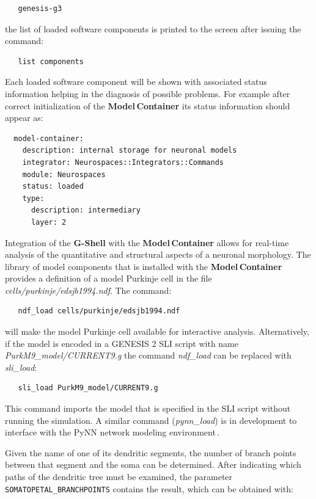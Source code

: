\documentclass[12pt]{article}
\begin{document}
{\footnotesize
\begin{verbatim}
   genesis-g3
\end{verbatim}
}

the list of loaded software components is printed to the screen after
issuing the command:

{\footnotesize
\begin{verbatim}
   list components
\end{verbatim}
}

Each loaded software component will be shown with associated status
information helping in the diagnosis of possible problems.  For
example after correct initialization of the {\bf Model\,Container} its
status information should appear as:

{\footnotesize
\begin{verbatim}
  model-container:
    description: internal storage for neuronal models
    integrator: Neurospaces::Integrators::Commands
    module: Neurospaces
    status: loaded
    type:
      description: intermediary
      layer: 2
\end{verbatim}
}

Integration of the {\bf G-Shell} with the {\bf Model\,Container}
allows for real-time analysis of the quantitative and structural
aspects of a neuronal morphology.  The library of model components
that is installed with the {\bf Model\,Container} provides a
definition of a model Purkinje cell in the file {\it
  cells/purkinje/edsjb1994.ndf}.  The command:{\footnotesize
\begin{verbatim}
   ndf_load cells/purkinje/edsjb1994.ndf
\end{verbatim}
}
will make the model Purkinje cell available for interactive analysis.
Alternatively, if the model is encoded in a GENESIS 2 SLI script with
name {\it PurkM9\_model/CURRENT9.g} the command {\it ndf\_load} can be
replaced with {\it sli\_load}:

{\footnotesize
\begin{verbatim}
   sli_load PurkM9_model/CURRENT9.g
\end{verbatim}
}

This command imports the model that is specified in the SLI script
without running the simulation.  A similar command ({\it pynn\_load})
is in development to interface with the PyNN network modeling
environment\,\cite{andrew08:_pynn}.

Given the name of one of its dendritic segments, the number of branch
points between that segment and the soma can be determined. After
indicating which paths of the dendritic tree must be examined, the
parameter {\tt SOMATOPETAL\_BRANCHPOINTS} contains the result, which
can be obtained with:
\end{document}
